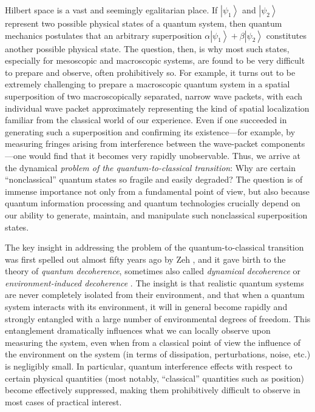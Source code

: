 \documentclass[3p,sort&compress]{elsarticle}
\newcommand{\ket}[1]{\left\vert{#1}\right\rangle}
\begin{document}
Hilbert space is a vast and seemingly egalitarian place. If $\ket{\psi_1}$ and $\ket{\psi_2}$ represent two possible physical states of a quantum system, then quantum mechanics postulates that an arbitrary superposition $\alpha\ket{\psi_1} + \beta \ket{\psi_2}$ constitutes another possible physical state. The question, then, is why most such states, especially for mesoscopic and macroscopic systems, are found to be very difficult to prepare and observe, often prohibitively so. For example, it turns out to be extremely challenging to prepare a macroscopic quantum system in a spatial superposition of two macroscopically separated, narrow wave packets, with each individual wave packet approximately representing the kind of spatial localization familiar from the classical world of our experience. Even if one succeeded in generating such a superposition and confirming its existence---for example, by measuring fringes arising from interference between the wave-packet components---one would find that it becomes very rapidly unobservable. Thus, we arrive at the dynamical \emph{problem of the quantum-to-classical transition}: Why are certain ``nonclassical'' quantum states so fragile and easily degraded? The question is of immense importance not only from a fundamental point of view, but also because quantum information processing and quantum technologies crucially depend on our ability to generate, maintain, and manipulate such nonclassical superposition states. 

The key insight in addressing the problem of the quantum-to-classical transition was first spelled out almost fifty years ago by Zeh \cite{Zeh:1970:yt}, and it gave birth to the theory of \emph{quantum decoherence}, sometimes also called \emph{dynamical decoherence} or \emph{environment-induced decoherence} \cite{Zeh:1970:yt,Zurek:1981:dd,Zurek:1982:tv,Paz:2001:aa,Zurek:2002:ii,Schlosshauer:2003:tv,Bacciagaluppi:2003:yz,Joos:2003:jh,Schlosshauer:2007:un}. The insight is that realistic quantum systems are never completely isolated from their environment, and that when a quantum system interacts with its environment, it will in general become rapidly  and strongly entangled with a large number of environmental degrees of freedom. This entanglement dramatically influences what we can locally observe upon measuring the system, even when from a classical point of view the influence of the environment on the system (in terms of dissipation, perturbations, noise, etc.) is negligibly small. In particular, quantum interference effects with respect to certain physical quantities (most notably, ``classical'' quantities such as position) become effectively suppressed, making them prohibitively difficult to observe in most cases of practical interest.
\end{document}

